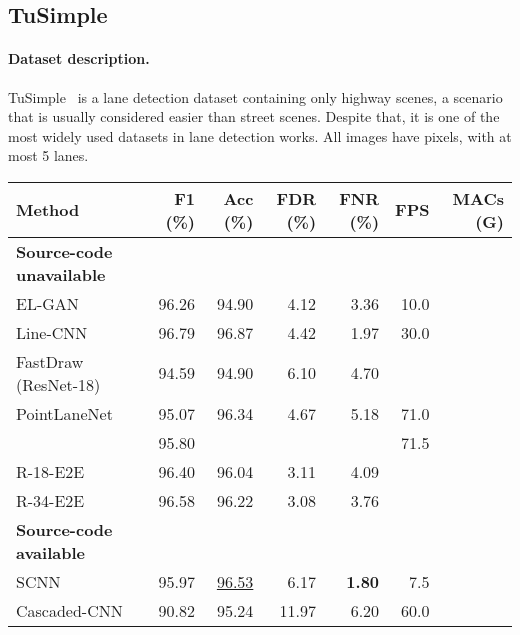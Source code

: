 \documentclass[final]{cvpr}
\begin{document}
\subsection{TuSimple}
\paragraph{Dataset description.}
TuSimple~\cite{tusimple} is a lane detection dataset containing only highway scenes, a scenario that is usually considered easier than street scenes. Despite that, it is one of the most widely used datasets in lane detection works. All images have  pixels, with at most 5 lanes.

\begin{table*}
    \begin{center}
            \begin{tabular}{@{}lrrrrrr@{}}
                \toprule
                \textbf{Method}           & \textbf{F1 (\%)} & \textbf{Acc (\%)} & \textbf{FDR (\%)} & \textbf{FNR (\%)} & \textbf{FPS} & \textbf{MACs (G)} \\ \midrule
                \textbf{Source-code unavailable} &&&&&& \\ \midrule
                EL-GAN~\cite{elgan}                           & 96.26  & 94.90  & 4.12  & 3.36  & 10.0  & \\
                Line-CNN~\cite{linecnn}                       & 96.79  & 96.87  & 4.42  & 1.97  & 30.0  & \\
                FastDraw (ResNet-18)~\cite{fastdraw}          & 94.59  & 94.90  & 6.10  & 4.70  &       & \\
                PointLaneNet~\cite{pointlanenet}              & 95.07  & 96.34  & 4.67  & 5.18  & 71.0  & \\
                \cite{end2end}                                & 95.80  &        &       &       & 71.5  & \\
                R-18-E2E~\cite{e2e-lmd}                       & 96.40  & 96.04  & 3.11  & 4.09  &       & \\
                R-34-E2E~\cite{e2e-lmd}                       & 96.58  & 96.22  & 3.08  & 3.76  &       & \\
                \midrule

                \textbf{Source-code available} &&&&&& \\ \midrule
                SCNN~\cite{scnn}                              & 95.97                                & \underline{96.53}                                 & 6.17                                 & \textbf{1.80}                        & 7.5                              & \\
                Cascaded-CNN~\cite{cascaded}                  & 90.82                                & 95.24                                 & 11.97                                & 6.20                                 & 60.0                             & \\


\end{tabular}
\end{center}
\end{table*}
\end{document}
